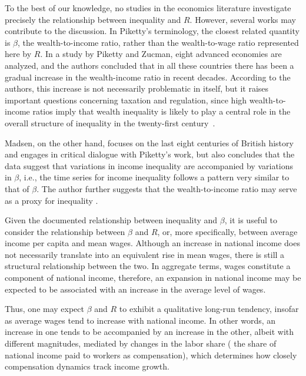 \documentclass[12pt]{article}
\begin{document}
To the best of our knowledge, no studies in the economics literature investigate precisely the relationship between inequality and $R$. However, several works may contribute to the discussion. 
In Piketty’s terminology, the closest related quantity is $\beta$, the wealth-to-income ratio, rather than the wealth-to-wage ratio represented here by $R$. 
In a study by Piketty and Zucman, eight advanced economies are analyzed, and the authors concluded that in all these countries there has been a gradual increase in the wealth-income ratio in recent decades.  According to the authors, this increase is not necessarily problematic in itself, but it raises important questions concerning taxation and regulation, since high wealth-to-income ratios imply that wealth inequality is likely to play a central role in the overall structure of inequality in the twenty-first century~\cite{repec:oup:qjecon:v:129:y:2014:i:3:p:1255-1310}.

Madsen, on the other hand, focuses on the last eight centuries of British history and engages in critical dialogue with Piketty's work, but also concludes that the data suggest that variations in income inequality are accompanied by variations in $\beta$, i.e., the time series for income inequality follows a pattern very similar to that of $\beta$. The author further suggests that the wealth-to-income ratio may serve as a proxy for inequality \cite{MADSEN2019246}.

Given the documented relationship between inequality and $\beta$, it is useful to consider the relationship between $\beta$ and $R$, or, more specifically, between average income per capita and mean wages.  Although an increase in national income does not necessarily translate into an equivalent rise in mean wages, there is still a structural relationship between the two.  In aggregate terms, wages constitute a component of national income,  therefore, an expansion in national income may be expected to be associated with an increase in the average level of wages\cite{Przekota2023CausalityIT}.   

Thus, one may expect $\beta$ and $R$ to exhibit a qualitative long-run tendency,  insofar as average wages tend to increase with national income. In other words,  an increase in one tends to be accompanied by an increase in the other, albeit with different magnitudes, mediated by changes in the labor share ( the share of national income paid to workers as compensation), which determines how closely compensation dynamics track income growth.
\end{document}
